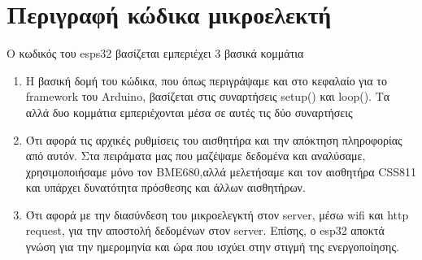 \section{Περιγραφή κώδικα μικροελεκτή}

Ο κωδικός του esps32 βασίζεται εμπεριέχει 3 βασικά κομμάτια

\begin{enumerate}
    \item Η βασική δομή του κώδικα, που όπως περιγράψαμε και στο κεφαλαίο για το framework του Arduino,
    βασίζεται στις συναρτήσεις setup() και loop(). Τα αλλά δυο κομμάτια εμπεριέχονται μέσα σε αυτές τις δύο συναρτήσεις
    \item Ότι αφορά τις αρχικές ρυθμίσεις του αισθητήρα και την απόκτηση πληροφορίας από αυτόν.
    Στα πειράματα μας που μαζέψαμε δεδομένα και αναλύσαμε, χρησιμοποιήσαμε μόνο τον BME680,αλλά μελετήσαμε και τον αισθητήρα CSS811 και υπάρχει δυνατότητα πρόσθεσης και άλλων αισθητήρων.
    \item Ότι αφορά με την διασύνδεση του μικροελεγκτή στον server, μέσω wifi και http request, για την αποστολή δεδομένων στον server. 
    Επίσης, ο esp32 αποκτά γνώση για την ημερομηνία και ώρα που ισχύει στην στιγμή της ενεργοποίησης.
\end{enumerate}


